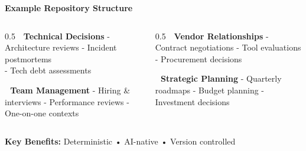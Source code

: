 \documentclass[
  ignorenonframetext,
  aspectratio=169,
]{beamer}
\begin{document}
\begin{frame}
\begin{block}{\textbf{Example Repository Structure}}
\label{example-repository-structure}
\begin{columns}[T]
\begin{column}{0.5\linewidth}
\textbf{📁 Technical Decisions} - Architecture reviews - Incident
postmortems\\
- Tech debt assessments

\textbf{👥 Team Management} - Hiring \& interviews - Performance reviews
- One-on-one contexts
\end{column}

\begin{column}{0.5\linewidth}
\textbf{🤝 Vendor Relationships} - Contract negotiations - Tool
evaluations - Procurement decisions

\textbf{🎯 Strategic Planning} - Quarterly roadmaps - Budget planning -
Investment decisions
\end{column}
\end{columns}

\textbf{Key Benefits:} Deterministic • AI-native • Version controlled
\end{block}
\end{frame}
\end{document}
